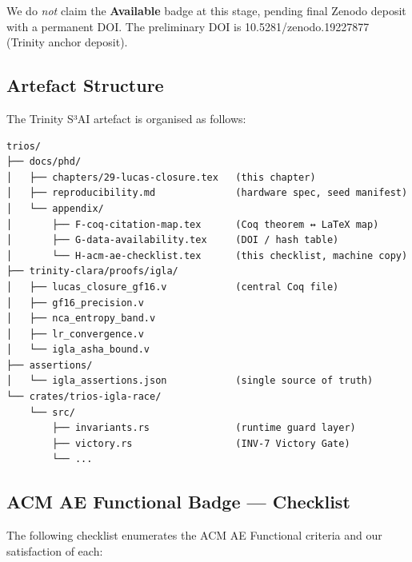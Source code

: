 We do \emph{not} claim the \textbf{Available} badge at this stage,
pending final Zenodo deposit with a permanent DOI.  The preliminary
DOI is 10.5281/zenodo.19227877 (Trinity anchor deposit).

\subsection{Artefact Structure}

The Trinity S³AI artefact is organised as follows:

\begin{verbatim}
trios/
├── docs/phd/
│   ├── chapters/29-lucas-closure.tex   (this chapter)
│   ├── reproducibility.md              (hardware spec, seed manifest)
│   └── appendix/
│       ├── F-coq-citation-map.tex      (Coq theorem ↔ LaTeX map)
│       ├── G-data-availability.tex     (DOI / hash table)
│       └── H-acm-ae-checklist.tex      (this checklist, machine copy)
├── trinity-clara/proofs/igla/
│   ├── lucas_closure_gf16.v            (central Coq file)
│   ├── gf16_precision.v
│   ├── nca_entropy_band.v
│   ├── lr_convergence.v
│   └── igla_asha_bound.v
├── assertions/
│   └── igla_assertions.json            (single source of truth)
└── crates/trios-igla-race/
    └── src/
        ├── invariants.rs               (runtime guard layer)
        ├── victory.rs                  (INV-7 Victory Gate)
        └── ...
\end{verbatim}

\subsection{ACM AE Functional Badge — Checklist}
\label{sec:29-functional}

The following checklist enumerates the ACM AE Functional criteria
\cite{acm_ae_policy} and our satisfaction of each:

